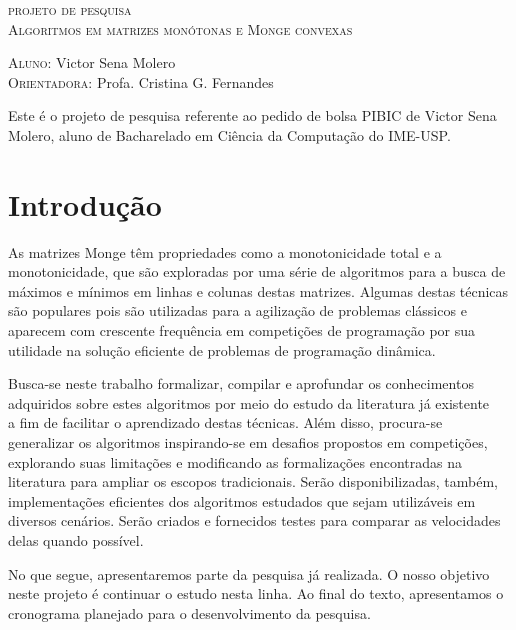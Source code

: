 \begin{center}
\LARGE{\scshape{projeto de pesquisa}} \\
\vspace{.5cm}
\large{\scshape{Algoritmos em matrizes monótonas e Monge convexas}} \\
\end{center}

\vspace{1cm}

\noindent
\textsc{Aluno:} Victor Sena Molero \\
\textsc{Orientadora:} Profa. Cristina G. Fernandes

\vspace{1cm}


Este é o projeto de pesquisa referente ao pedido de bolsa PIBIC de Victor Sena Molero, aluno de Bacharelado em Ciência da Computação do IME-USP.

\section{Introdução}

As matrizes Monge têm propriedades como a monotonicidade total e a monotonicidade, que são exploradas por uma série de algoritmos para a busca de máximos e mínimos em linhas e colunas destas matrizes. Algumas destas técnicas são populares pois são utilizadas para a agilização de problemas clássicos e aparecem com crescente frequência em competições de programação por sua utilidade na solução eficiente de problemas de programação dinâmica.

Busca-se neste trabalho formalizar, compilar e aprofundar os conhecimentos adquiridos sobre estes algoritmos por meio do estudo da literatura já existente~\cite{Galil:1992}~\cite{Bein:2009} a fim de facilitar o aprendizado destas técnicas. Além disso, procura-se generalizar os algoritmos inspirando-se em desafios propostos em competições, explorando suas limitações e modificando as formalizações encontradas na literatura para ampliar os escopos tradicionais. Serão disponibilizadas, também, implementações eficientes dos algoritmos estudados que sejam utilizáveis em diversos cenários. Serão criados e fornecidos testes para comparar as velocidades delas quando possível.

No que segue, apresentaremos parte da pesquisa já realizada. O nosso objetivo neste projeto é continuar o estudo nesta linha. Ao final do texto, apresentamos o cronograma planejado para o desenvolvimento da pesquisa.
